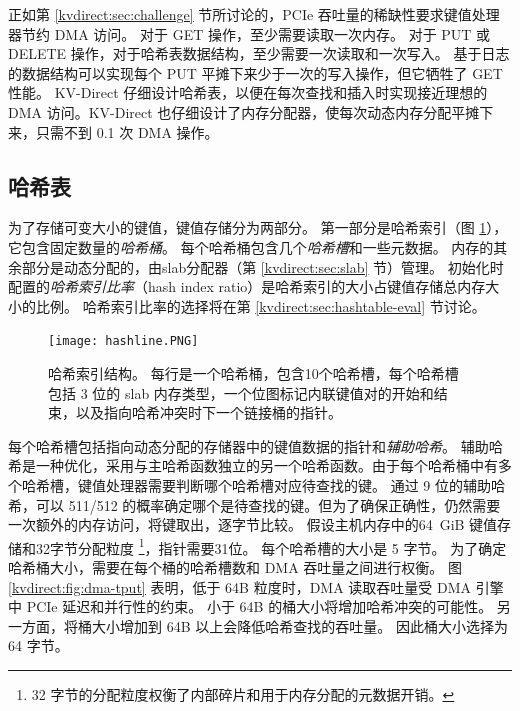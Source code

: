 正如第 \ref {kvdirect:sec:challenge} 节所讨论的，PCIe 吞吐量的稀缺性要求键值处理器节约 DMA 访问。
对于 GET 操作，至少需要读取一次内存。
对于 PUT 或 DELETE 操作，对于哈希表数据结构，至少需要一次读取和一次写入。
基于日志的数据结构可以实现每个 PUT 平摊下来少于一次的写入操作，但它牺牲了 GET 性能。
KV-Direct 仔细设计哈希表，以便在每次查找和插入时实现接近理想的 DMA 访问。KV-Direct 也仔细设计了内存分配器，使每次动态内存分配平摊下来，只需不到 0.1 次 DMA 操作。

\subsection{哈希表}
\label{kvdirect:sec:hashtable}

为了存储可变大小的键值，键值存储分为两部分。 第一部分是哈希索引（图 \ref {kvdirect:fig:hashtable}），它包含固定数量的\textit {哈希桶}。 每个哈希桶包含几个\textit {哈希槽}和一些元数据。 内存的其余部分是动态分配的，由slab分配器（第 \ref {kvdirect:sec:slab} 节）管理。
初始化时配置的\textit {哈希索引比率}（hash index ratio）是哈希索引的大小占键值存储总内存大小的比例。
哈希索引比率的选择将在第 \ref {kvdirect:sec:hashtable-eval} 节讨论。


\begin{figure}[htbp]
	\centering
	\texttt{[image: hashline.PNG]}
	\caption{哈希索引结构。 每行是一个哈希桶，包含10个哈希槽，每个哈希槽包括 3 位的 slab 内存类型，一个位图标记内联键值对的开始和结束，以及指向哈希冲突时下一个链接桶的指针。}
	\label{kvdirect:fig:hashtable}
\end{figure}



每个哈希槽包括指向动态分配的存储器中的键值数据的指针和\textit{辅助哈希}。
辅助哈希是一种优化，采用与主哈希函数独立的另一个哈希函数。由于每个哈希桶中有多个哈希槽，键值处理器需要判断哪个哈希槽对应待查找的键。
通过 9 位的辅助哈希，可以 511/512 的概率确定哪个是待查找的键。但为了确保正确性，仍然需要一次额外的内存访问，将键取出，逐字节比较。
假设主机内存中的64~GiB 键值存储和32字节分配粒度 \footnote{32 字节的分配粒度权衡了内部碎片和用于内存分配的元数据开销。}，指针需要31位。
每个哈希槽的大小是 5 字节。
为了确定哈希桶大小，需要在每个桶的哈希槽数和 DMA 吞吐量之间进行权衡。
图 \ref {kvdirect:fig:dma-tput} 表明，低于 64B 粒度时，DMA 读取吞吐量受 DMA 引擎中 PCIe 延迟和并行性的约束。
小于 64B 的桶大小将增加哈希冲突的可能性。
另一方面，将桶大小增加到 64B 以上会降低哈希查找的吞吐量。
因此桶大小选择为 64 字节。

